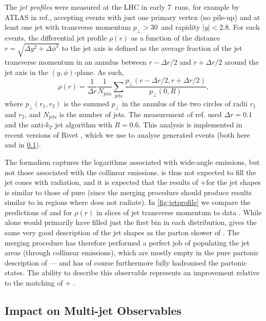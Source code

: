 The \emph{jet profiles} were measured at the LHC 
in early 7\TeV\ runs, for example by ATLAS in ref.\@ \cite{Aad:2011kq},  
accepting events with just one primary vertex (no pile-up) and at least one
jet with transverse momentum $p_\perp>30$\GeV\ and rapidity $|y|<2.8$. For such events, the differential
jet profile $\rho(r)$ as a function of the distance
$r=\sqrt{\Delta y^2+\Delta \phi^2}$ to the jet axis is defined as the average
fraction of the jet transverse momentum in an annulus between $r-\Delta r/2$
and $r+\Delta r/2$ around the jet axis in the $(y,\phi)$-plane. As such, 
\begin{equation}
  \label{eq:rhoofr}
  \rho(r)=\frac 1 {\Delta r} \frac 1
  {N_{\mathrm{jets}}}\sum_{\mathrm{jets}}\frac{p_\perp(r-\Delta r/2,r+\Delta r/2)}{p_\perp(0,R)},
\end{equation}
where $p_\perp(r_1,r_2)$ is the summed $p_\perp$ in the annulus of the two
circles of radii $r_1$ and $r_2$, and $N_{\mathrm{jets}}$ is the number of
jets. The measurement of ref.\@ \cite{Aad:2011kq} used $\Delta r=0.1$ and
the anti-$k_T$ jet algorithm \cite{Cacciari:2008gp} with $R=0.6$. This
analysis is implemented in recent versions of Rivet \cite{Buckley:2010ar},
which we use to analyse generated events (both here and in \cref{sec:impact-multi-jet}).

The \HEJ formalism captures the logarithms associated with wide-angle
emissions, but not those associated with the collinear emissions. \HEJ is thus
not expected to fill the jet cones with radiation, and it is expected that
the results of \HEJ\!+\py for the jet shapes is similar to those of pure
\py (since the merging procedure should produce results similar to \py in
regions where \HEJ does not radiate). In \cref{fig:jetprofile} we compare 
the predictions of \py and \HEJpy for $\rho(r)$ in slices of jet transverse momentum
to data \cite{Aad:2011kq}. While
\HEJ alone would primarily have filled just the first bin in each distribution,
\HEJpy gives the same very good description of the jet shapes
as the parton shower of \py. The merging procedure has therefore performed a
perfect job of populating the jet areas (through collinear emissions), which
are mostly empty in the pure partonic description of \HEJ --- and has of
course furthermore fully hadronised the partonic states.
The ability to describe this observable represents an improvement relative to
the matching of \HEJ + \ariadne.

\subsection{Impact on Multi-jet Observables}
\label{sec:impact-multi-jet}


